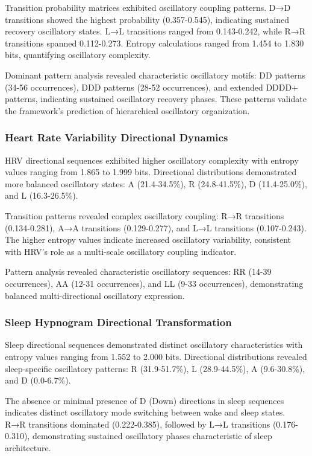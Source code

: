 Transition probability matrices exhibited oscillatory coupling patterns. D→D transitions showed the highest probability (0.357-0.545), indicating sustained recovery oscillatory states. L→L transitions ranged from 0.143-0.242, while R→R transitions spanned 0.112-0.273. Entropy calculations ranged from 1.454 to 1.830 bits, quantifying oscillatory complexity.

Dominant pattern analysis revealed characteristic oscillatory motifs: DD patterns (34-56 occurrences), DDD patterns (28-52 occurrences), and extended DDDD+ patterns, indicating sustained oscillatory recovery phases. These patterns validate the framework's prediction of hierarchical oscillatory organization.

\subsubsection{Heart Rate Variability Directional Dynamics}

HRV directional sequences exhibited higher oscillatory complexity with entropy values ranging from 1.865 to 1.999 bits. Directional distributions demonstrated more balanced oscillatory states: A (21.4-34.5\%), R (24.8-41.5\%), D (11.4-25.0\%), and L (16.3-26.5\%).

Transition patterns revealed complex oscillatory coupling: R→R transitions (0.134-0.281), A→A transitions (0.129-0.277), and L→L transitions (0.107-0.243). The higher entropy values indicate increased oscillatory variability, consistent with HRV's role as a multi-scale oscillatory coupling indicator.

Pattern analysis revealed characteristic oscillatory sequences: RR (14-39 occurrences), AA (12-31 occurrences), and LL (9-33 occurrences), demonstrating balanced multi-directional oscillatory expression.

\subsubsection{Sleep Hypnogram Directional Transformation}

Sleep directional sequences demonstrated distinct oscillatory characteristics with entropy values ranging from 1.552 to 2.000 bits. Directional distributions revealed sleep-specific oscillatory patterns: R (31.9-51.7\%), L (28.9-44.5\%), A (9.6-30.8\%), and D (0.0-6.7\%).

The absence or minimal presence of D (Down) directions in sleep sequences indicates distinct oscillatory mode switching between wake and sleep states. R→R transitions dominated (0.222-0.385), followed by L→L transitions (0.176-0.310), demonstrating sustained oscillatory phases characteristic of sleep architecture.

